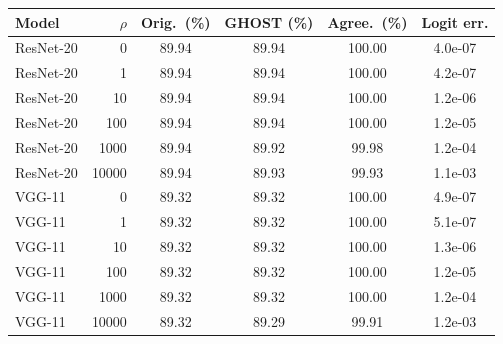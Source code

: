 \footnotesize
\setlength{\tabcolsep}{2.5pt}
\begin{tabular}{@{}lrcccc@{}}
\toprule
Model & $\rho$ & Orig.\ (\%) & GHOST (\%) & Agree.\ (\%) & Logit err. \\
\midrule
ResNet-20 & 0 & 89.94 & 89.94 & 100.00 & 4.0e-07 \\
ResNet-20 & 1 & 89.94 & 89.94 & 100.00 & 4.2e-07 \\
ResNet-20 & 10 & 89.94 & 89.94 & 100.00 & 1.2e-06 \\
ResNet-20 & 100 & 89.94 & 89.94 & 100.00 & 1.2e-05 \\
ResNet-20 & 1000 & 89.94 & 89.92 & 99.98 & 1.2e-04 \\
ResNet-20 & 10000 & 89.94 & 89.93 & 99.93 & 1.1e-03 \\
VGG-11 & 0 & 89.32 & 89.32 & 100.00 & 4.9e-07 \\
VGG-11 & 1 & 89.32 & 89.32 & 100.00 & 5.1e-07 \\
VGG-11 & 10 & 89.32 & 89.32 & 100.00 & 1.3e-06 \\
VGG-11 & 100 & 89.32 & 89.32 & 100.00 & 1.2e-05 \\
VGG-11 & 1000 & 89.32 & 89.32 & 100.00 & 1.2e-04 \\
VGG-11 & 10000 & 89.32 & 89.29 & 99.91 & 1.2e-03 \\
\bottomrule
\end{tabular}